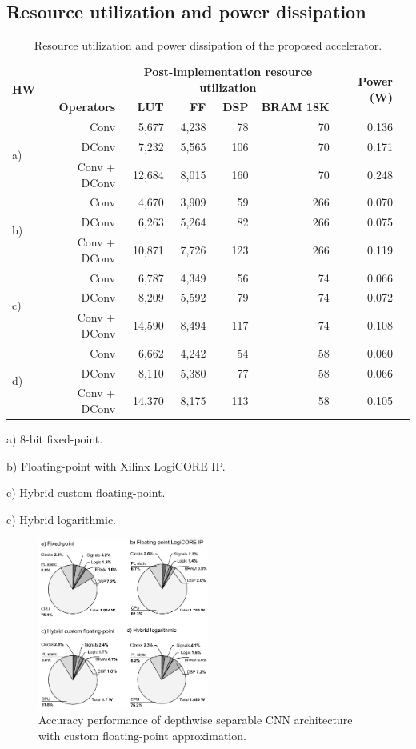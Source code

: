 \subsection{Resource utilization and power dissipation}
\begin{table}[!htp]\centering
	\caption{Resource utilization and power dissipation of the proposed accelerator.}\label{tab: }
	\scriptsize
\begin{tabular}{lrrrrrrr}\toprule
	\multirow{2}{*}{\textbf{HW}} &\textbf{} &\multicolumn{4}{c}{\textbf{Post-implementation resource utilization}} &\multirow{2}{*}{\textbf{Power (W)}} \\\cmidrule{3-6}
	&\textbf{Operators} &\textbf{LUT} &\textbf{FF} &\textbf{DSP} &\textbf{BRAM 18K} & \\\midrule
	\multirow{3}{*}{a)} &Conv &5,677 &4,238 &78 &70 &0.136 \\
	&DConv &7,232 &5,565 &106 &70 &0.171 \\
	&Conv + DConv &12,684 &8,015 &160 &70 &0.248 \\
	\multirow{3}{*}{b)} &Conv &4,670 &3,909 &59 &266 &0.070 \\
	&DConv &6,263 &5,264 &82 &266 &0.075 \\
	&Conv + DConv &10,871 &7,726 &123 &266 &0.119 \\
	\multirow{3}{*}{c)} &Conv &6,787 &4,349 &56 &74 &0.066 \\
	&DConv &8,209 &5,592 &79 &74 &0.072 \\
	&Conv + DConv &14,590 &8,494 &117 &74 &0.108 \\
	\multirow{3}{*}{d)} &Conv &6,662 &4,242 &54 &58 &0.060 \\
	&DConv &8,110 &5,380 &77 &58 &0.066 \\
	&Conv + DConv &14,370 &8,175 &113 &58 &0.105 \\
	\bottomrule
\end{tabular}
	\begin{tablenotes}
		\item a) 8-bit fixed-point.
		\item b) Floating-point with Xilinx LogiCORE IP.
		\item c) Hybrid custom floating-point.
		\item c) Hybrid logarithmic.
	\end{tablenotes}
\end{table}

\begin{figure}[t!]
	\centering
	\includegraphics[width=0.5\textwidth]{../figures/power_breackdown.pdf}
	\caption{Accuracy performance of depthwise separable CNN architecture with custom floating-point approximation.}
	\label{fig:acc_custom}
\end{figure}